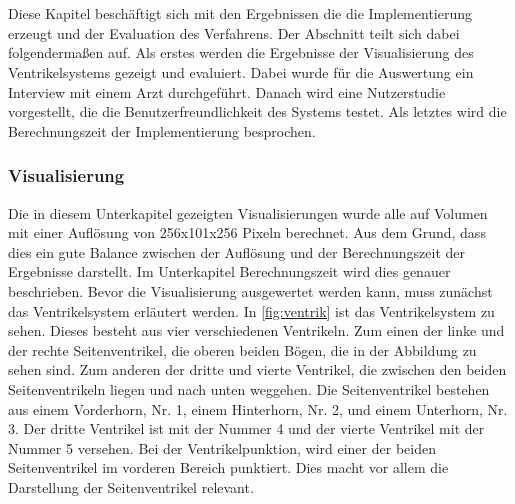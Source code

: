 \chapter{}
\label{sec:results}





Diese Kapitel beschäftigt sich mit den Ergebnissen die die Implementierung erzeugt und der Evaluation des Verfahrens. Der Abschnitt teilt sich dabei folgendermaßen auf.
\newline
Als erstes werden die Ergebnisse der Visualisierung des Ventrikelsystems gezeigt und evaluiert. Dabei wurde für die Auswertung ein Interview mit einem Arzt durchgeführt. Danach wird eine Nutzerstudie vorgestellt, die die Benutzerfreundlichkeit des Systems testet. Als letztes wird die Berechnungszeit der Implementierung besprochen.


\subsection{Visualisierung}

Die in diesem Unterkapitel gezeigten Visualisierungen wurde alle auf Volumen mit einer Auflösung von 256x101x256 Pixeln berechnet. Aus dem Grund, dass dies ein gute Balance zwischen der Auflösung und der Berechnungszeit der Ergebnisse darstellt. Im Unterkapitel Berechnungszeit wird dies genauer beschrieben. Bevor die Visualisierung ausgewertet werden kann, muss zunächst das Ventrikelsystem erläutert werden.
\newline
In \autoref{fig:ventrik} ist das Ventrikelsystem zu sehen. Dieses besteht aus vier verschiedenen Ventrikeln.
\newline
Zum einen der linke und der rechte Seitenventrikel, die oberen beiden Bögen, die in der Abbildung zu sehen sind. Zum anderen der dritte und vierte Ventrikel, die zwischen den beiden Seitenventrikeln liegen und nach unten weggehen.
\newline
Die Seitenventrikel bestehen aus einem Vorderhorn, Nr. 1,  einem Hinterhorn, Nr. 2, und einem Unterhorn, Nr. 3. Der dritte Ventrikel ist mit der Nummer 4 und der vierte Ventrikel mit der Nummer 5 versehen.
\newline
Bei der Ventrikelpunktion, wird einer der beiden Seitenventrikel im vorderen Bereich punktiert. Dies macht vor allem die Darstellung der Seitenventrikel relevant.

